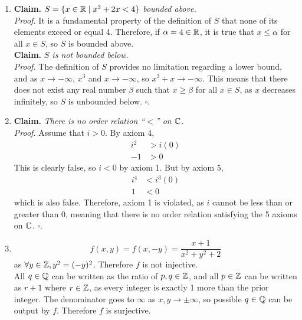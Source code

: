 \documentclass[../MATH145.tex]{subfiles}
\begin{document}
		\begin{enumerate}
			\item
				\textbf{Claim.} \textit{\(S = \{x \in \mathbb{R} \mid x^3 + 2x < 4\}\) bounded above.} \\
					\textit{Proof.} 
						It is a fundamental property of the definition of \(S\) that none of its elements exceed or equal 4. Therefore, if \(\alpha = 4 \in \mathbb{R}\), it is true that \(x \le \alpha\) for all \(x \in S\), so \(S\) is bounded above. \\
				\textbf{Claim.} \textit{\(S\) is not bounded below.} \\
					\textit{Proof.} The definition of \(S\) provides no limitation regarding a lower bound, and as \(x \to -\infty\), \(x^3\) and \(x \to -\infty\), so \(x^3 + x \to -\infty\). This means that there does not exist any real number \(\beta\) such that \(x \ge \beta\) for all \(x \in S\), as \(x\) decreases infinitely, so \(S\) is unbounded below. \(\square\).
			\item
				\textbf{Claim.} \textit{There is no order relation \enquote{\(<\)} on \(\mathbb{C}\).} \\
					\textit{Proof.} 
						Assume that \(i > 0\). By axiom 4,
							\begin{align*}
								i^2 &> i(0) \\
								-1 &> 0
							\end{align*}
						This is clearly false, so \(i < 0\) by axiom 1. But by axiom 5,
							\begin{align*}
								i^4 &< i^3(0) \\
								1 &< 0
							\end{align*}
						which is also false. Therefore, axiom 1 is violated, as \(i\) cannot be less than or greater than 0, meaning that there is no order relation satisfying the 5 axioms on \(\mathbb{C}\). \(\square\).
			\item
				\begin{tasks}
					\task
						\[
							f(x, y) = f(x, -y)	
								= \frac{x + 1}{x^2 + y^2 + 2}
						\]
						as \(\forall y \in \mathbb{Z}, y^2 = (-y)^2\). Therefore \(f\) is not injective. \\
						All \(q \in \mathbb{Q}\) can be written as the ratio of \(p,q  \in \mathbb{Z}\), and all \(p \in \mathbb{Z}\) can be written as \(r + 1\) where \(r \in \mathbb{Z}\), as every integer is exactly 1 more than the prior integer. The denominator goes to \(\infty\) as \(x, y \to \pm\infty\), so possible \(q \in \mathbb{Q}\) can be output by \(f\). Therefore \(f\) is surjective.
					\task
						\[
\]
\end{tasks}
\end{enumerate}
\end{document}
